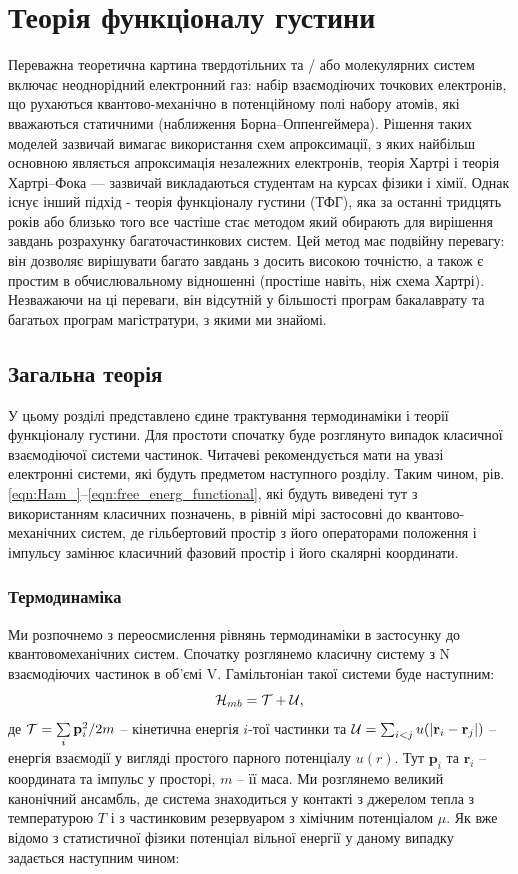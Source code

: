 \chapter{Теорія функціоналу густини}
Переважна теоретична картина твердотільних та / або молекулярних систем включає неоднорідний електронний газ: набір взаємодіючих точкових електронів, що рухаються квантово-механічно в потенційному полі набору атомів, які вважаються статичними (наближення Борна–Оппенгеймера). Рішення таких моделей зазвичай вимагає використання схем апроксимації, з яких найбільш основною являється апроксимація незалежних електронів, теорія Хартрі і теорія Хартрі–Фока — зазвичай викладаються студентам на курсах фізики і хімії. Однак існує інший підхід - теорія функціоналу густини (ТФГ), яка за останні тридцять років або близько того все частіше стає методом який обирають для вирішення завдань розрахунку багаточастинкових систем. Цей метод має подвійну перевагу: він дозволяє вирішувати багато завдань з досить високою точністю, а також є простим в обчислювальному відношенні (простіше навіть, ніж схема Хартрі). Незважаючи на ці переваги, він відсутній у більшості програм бакалаврату та багатьох програм магістратури, з якими ми знайомі.
\section{Загальна теорія}
У цьому розділі представлено єдине трактування термодинаміки і теорії функціоналу густини. Для простоти спочатку буде розглянуто випадок класичної взаємодіючої системи частинок. Читачеві рекомендується мати на увазі електронні системи, які будуть предметом наступного розділу. Таким чином, рів. \ref{eqn:Ham_}--\ref{eqn:free_energ_functional}, які будуть виведені тут з використанням класичних позначень, в рівній мірі застосовні до квантово-механічних систем, де гільбертовий простір з його операторами положення і імпульсу замінює класичний фазовий простір і його скалярні координати.
\subsection{Термодинаміка}
Ми розпочнемо з переосмислення рівнянь термодинаміки в застосунку до квантовомеханічних систем. Спочатку розглянемо класичну систему з N взаємодіючих частинок в об'ємі V. Гамільтоніан такої системи буде наступним:
\begin{equation}
\label{eqn:Ham_}
	{\cal H}_{mb} = {\cal T} + {\cal U},
\end{equation}
де ${\cal T} = \sum\limits_{i}\textbf{p}_i^2/2m$ -- кінетична енергія $i$-тої частинки та ${\cal U} = \sum_{i < j}u(|\textbf{r}_i - \textbf{r}_j|)$ -- енергія взаємодії у вигляді простого парного потенціалу $u(r)$. Тут $\textbf{p}_i$ та $\textbf{r}_i$ -- координата та імпульс у просторі, $m$ -- її маса. 
Ми розглянемо великий канонічний ансамбль, де система знаходиться у контакті з джерелом тепла з температурою $T$ і з частинковим резервуаром з хімічним потенціалом $\mu$. Як вже відомо з статистичної фізики потенціал вільної енергії у даному випадку задається наступним чином:

